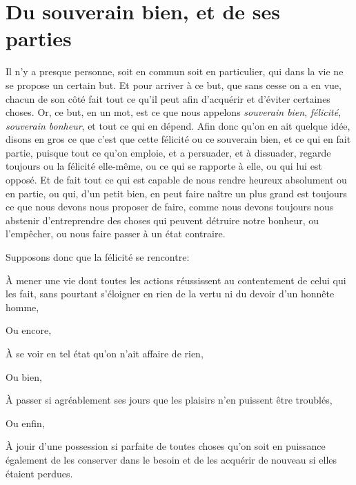 
\section{Du souverain bien, et de ses parties}

Il n'y a presque personne, soit en commun soit en particulier, qui dans la vie ne se propose un certain
but. Et pour arriver à ce but, que sans cesse on a en vue, chacun de son côté fait tout ce qu'il peut afin
d'acquérir et d'éviter certaines choses. Or, ce but, en un mot, est ce que nous appelons \emph{souverain
bien}, \emph{félicité}, \emph{souverain bonheur}, et tout ce qui en dépend. Afin donc qu'on en ait quelque
idée, disons en gros ce que c'est que cette félicité ou ce souverain bien, et ce qui en fait partie, puisque
tout ce qu'on emploie, et a persuader, et à dissuader, regarde toujours ou la félicité elle-même, ou ce qui
se rapporte à elle, ou qui lui est opposé. Et de fait tout ce qui est capable de nous rendre heureux absolument
ou en partie, ou qui, d'un petit bien, en peut faire naître un plus grand est toujours ce que nous devons nous
proposer de faire, comme nous devons toujours nous abstenir d'entreprendre des choses qui peuvent détruire
notre bonheur, ou l'empêcher, ou nous faire passer à un état contraire. 

Supposons donc que la félicité se rencontre:

\begin{emphpar}
	À mener une vie dont toutes les actions réussissent au contentement de celui qui les fait, sans pourtant
	s'éloigner en rien de la vertu ni du devoir d'un honnête homme,
\end{emphpar}

Ou encore, 

\begin{emphpar}
	À se voir en tel état qu'on n'ait affaire de rien,
\end{emphpar}

Ou bien,

\begin{emphpar}
	À passer si agréablement ses jours que les plaisirs n'en puissent être troublés,
\end{emphpar}

Ou enfin,

\begin{emphpar}
	À jouir d'une possession si parfaite de toutes choses qu'on soit en puissance également de les conserver
	dans le besoin et de les acquérir de nouveau si elles étaient perdues.
\end{emphpar}

